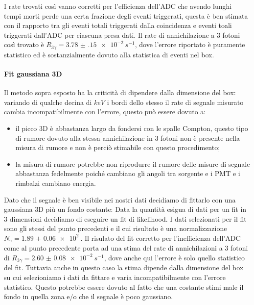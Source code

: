 I rate trovati così vanno corretti per l'efficienza dell'ADC che avendo lunghi tempi morti perde una certa frazione degli eventi triggerati, questa è ben stimata con il rapporto tra gli eventi totali triggerati dalla coincidenza e eventi toali triggerati dall'ADC per ciascuna presa dati.
Il rate di annichilazione a 3 fotoni così trovato è $R_{3\gamma} = \SI{3.78(15)e-2}{s^{-1}}$, dove l'errore riportato è puramente statistico ed è sostanzialmente dovuto alla statistica di eventi nel box.

\paragraph{Fit gaussiana 3D}
Il metodo sopra esposto ha la criticità di dipendere dalla dimensione del box: variando di qualche decina di $\si{keV}$ i bordi dello stesso il rate di segnale misurato cambia incompatibilmente con l'errore, questo può essere dovuto a:
\begin{itemize}
	\item il picco 3D è abbastanza largo da fondersi con le spalle Compton, questo tipo di rumore dovuto alla stessa annichilazione in 3 fotoni non è presente nella misura di rumore e non è perciò stimabile con questo procedimento;
	\item la misura di rumore potrebbe non riprodurre il rumore delle misure di segnale abbastanza fedelmente poiché cambiano gli angoli tra sorgente e i PMT e i rimbalzi cambiano energia.
\end{itemize}
Dato che il segnale è ben visibile nei nostri dati decidiamo di fittarlo con una gaussiana 3D più un fondo costante: 
Data la quantità esigua di dati per un fit in 3 dimensioni decidiamo di eseguire un fit di likelihood. I dati selezionati per il fit sono gli stessi del punto precedenti e il cui risultato è una normalizzazione $N_{\gamma} = \SI{1.89(6)e2}{}$. Il risulato del fit corretto per l'inefficienza dell'ADC come al punto precedente porta ad una stima del rate di annichilazioni a 3 fotoni di $R_{3\gamma} = \SI{2.60(8)e-2}{s^{-1}}$, dove anche qui l'errore è solo quello statistico del fit.
Tuttavia anche in questo caso la stima dipende dalla dimensione del box su cui selezioniamo i dati da fittare e varia incompatibilmente con l'errore statistico. Questo potrebbe essere dovuto al fatto che una costante stimi male il fondo in quella zona e/o che il segnale è poco gaussiano.


